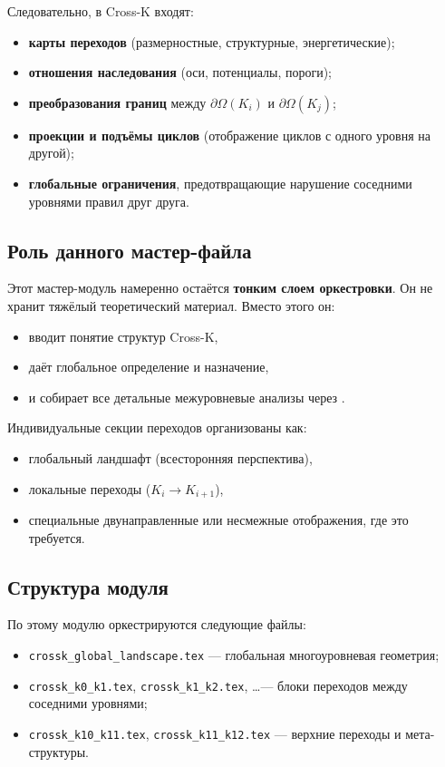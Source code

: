 Следовательно, в Cross-K входят:
\begin{itemize}
  \item \textbf{карты переходов} (размерностные, структурные, энергетические);
  \item \textbf{отношения наследования} (оси, потенциалы, пороги);
  \item \textbf{преобразования границ} между $\partial\Omega(K_i)$ и
        $\partial\Omega(K_j)$;
  \item \textbf{проекции и подъёмы циклов} (отображение циклов с одного уровня
        на другой);
  \item \textbf{глобальные ограничения}, предотвращающие нарушение соседними
        уровнями правил друг друга.
\end{itemize}

\subsection{Роль данного мастер-файла}
Этот мастер-модуль намеренно остаётся \textbf{тонким слоем оркестровки}.
Он не хранит тяжёлый теоретический материал. Вместо этого он:
\begin{itemize}
  \item вводит понятие структур Cross-K,
  \item даёт глобальное определение и назначение,
  \item и собирает все детальные межуровневые анализы через \verb||.
\end{itemize}

Индивидуальные секции переходов организованы как:
\begin{itemize}
  \item глобальный ландшафт (всесторонняя перспектива),
  \item локальные переходы ($K_i \rightarrow K_{i+1}$),
  \item специальные двунаправленные или несмежные отображения, где это требуется.
\end{itemize}

\subsection{Структура модуля}
\noindent По этому модулю оркестрируются следующие файлы:
\begin{itemize}
  \item \verb|crossk_global_landscape.tex| — глобальная многоуровневая геометрия;
  \item \verb|crossk_k0_k1.tex|, \verb|crossk_k1_k2.tex|, \dots —
        блоки переходов между соседними уровнями;
  \item \verb|crossk_k10_k11.tex|, \verb|crossk_k11_k12.tex| — верхние
        переходы и мета-структуры.
\end{itemize}

